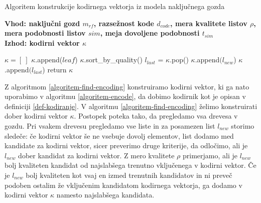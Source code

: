 \documentclass[12pt,a4paper]{article}
\begin{document}
\begin{algorithm}[h!]
  \caption{Algoritem konstrukcije kodirnega vektorja iz modela naključnega gozda}
  \label{algoritem-find-encoding}
  \raggedright
  \textbf{Vhod: naključni gozd $m_{rf}$, razsežnost kode $d_{code}$, mera kvalitete listov $\rho$, mera podobnosti listov $sim$, meja dovoljene podobnosti $t_{sim}$}  \\
  \textbf{Izhod: kodirni vektor $\kappa$} %
  \begin{algorithmic}[1]
	\State $\kappa = [\ ]$
				\State $\kappa$.append($leaf$)
			\EndIf
		\EndFor
	\EndFor
				\State $\kappa$.sort\_by\_quality()
				\State $l_{last}$ = $\kappa$.pop()
						\State $\kappa$.append$(l_{new}$)
					\Else
						\State $\kappa$.append$(l_{last}$)
					\EndIf
				\EndIf
			\EndIf
		\EndFor
	\EndFor	
	\State return $\kappa$
  \end{algorithmic}
\end{algorithm}

Z algoritmom \ref{algoritem-find-encoding} konstruiramo kodirni vektor, ki ga nato uporabimo v algoritmu \ref{algoritem-encode}, 
da dobimo kodirnik kot je opisan v definiciji \ref{def-kodiranje}.
V algoritmu \ref{algoritem-find-encoding} želimo konstruirati dober kodirni vektor $\kappa$. Postopek poteka tako, da pregledamo vsa drevesa v gozdu. 
Pri vsakem drevesu pregledamo vse liste in za posamezen list $l_{new}$ storimo sledeče: 
če kodirni vektor še ne vsebuje dovolj elementov, list dodamo med kandidate za kodirni vektor, sicer preverimo druge kriterije, da odločimo, ali je $l_{new}$ dober kandidat za kodirni vektor. 
Z mero kvalitete $\rho$ primerjamo, ali je $l_{new}$ bolj kvaliteten kandidat od najslabšega trenutno vključenega v kodirni vektor. 
Če je $l_{new}$ bolj kvaliteten kot vsaj en izmed trenutnih kandidatov in ni preveč podoben ostalim že vključenim kandidatom kodirnega vektorja, ga dodamo v kodirni vektor $\kappa$ namesto najslabšega kandidata.
\end{document}
